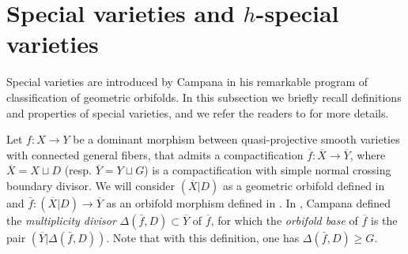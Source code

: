 \documentclass[11pt,english]{smfart}
\theoremstyle{plain}
\theoremstyle{definition}
\theoremstyle{remark}
\numberwithin{equation}{subsection}
\theoremstyle{plain}
\begin{document}
 



















  \section{Special varieties and $h$-special varieties} \label{sec:spechspecial}
Special varieties are introduced by Campana \cite{Cam04,Cam11} in his  remarkable program of classification of geometric orbifolds.  In this subsection we briefly recall definitions and properties of special varieties, and we refer the readers to \cite{Cam11} for more details. 
 
Let $f : X \to Y$ be a dominant morphism between quasi-projective smooth varieties with connected general fibers, that admits a compactification \(\overline{f} : \overline{X} \to \overline{Y}\), where \(\overline{X} = X \sqcup D\) (resp. \(\overline{Y} = Y \sqcup G\)) is a compactification with simple normal crossing boundary divisor.  We will consider $(\overline{X}| D)$ as a geometric orbifold  defined in \cite[D\'efinition 2.1]{Cam11} and $\bar{f}:(\overline{X}| D)\to \overline{Y}$ as  an orbifold morphism  defined in \cite[D\'efinition 2.4]{Cam11} .  In \cite[\S 2.1]{Cam11}, Campana defined the \emph{multiplicity divisor} $\Delta(\bar{f}, D)\subset \overline{Y}$ of $\overline{f}$, for which the \emph{orbifold base} of $\overline{f}$ is the pair $(\overline{Y}|\Delta(\bar{f}, D))$. Note that with this definition, one has \(\Delta(\bar{f}, D) \geq G\). 
\end{document}
